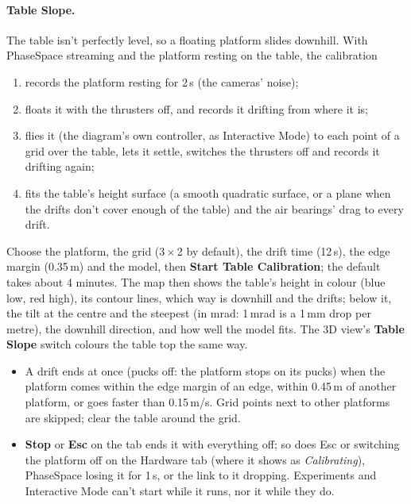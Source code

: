 \documentclass[11pt,a4paper]{article}
\newcommand{\ui}[1]{\textsf{\textbf{#1}}}
\begin{document}
\paragraph{Table Slope.} The table isn't perfectly level, so a floating platform slides downhill. With PhaseSpace
streaming and the platform resting on the table, the calibration
\begin{enumerate}[nosep]
  \item records the platform resting for 2\,s (the cameras' noise);
  \item floats it with the thrusters off, and records it drifting from where it is;
  \item flies it (the diagram's own controller, as Interactive Mode) to each point of a grid over the table, lets it
        settle, switches the thrusters off and records it drifting again;
  \item fits the table's height surface (a smooth quadratic surface, or a plane when the drifts don't cover enough
        of the table) and the air bearings' drag to every drift.
\end{enumerate}
Choose the platform, the grid (3\,$\times$\,2 by default), the drift time (12\,s), the edge margin (0.35\,m) and the
model, then \ui{Start Table Calibration}; the default takes about 4 minutes. The map then shows the table's height
in colour (blue low, red high), its contour lines, which way is downhill and the drifts; below it, the tilt at the
centre and the steepest (in mrad: 1\,mrad is a 1\,mm drop per metre), the downhill direction, and how well the
model fits. The 3D view's \ui{Table Slope} switch colours the table top the same way.

\begin{warnbox}
\begin{itemize}[nosep]
  \item A drift ends at once (pucks off: the platform stops on its pucks) when the platform comes within the edge
        margin of an edge, within 0.45\,m of another platform, or goes faster than 0.15\,m/s. Grid points next to
        other platforms are skipped; clear the table around the grid.
  \item \ui{Stop} or \textbf{Esc} on the tab ends it with everything off; so does Esc or switching the platform off
        on the Hardware tab (where it shows as \emph{Calibrating}), PhaseSpace losing it for 1\,s, or the link to it
        dropping. Experiments and Interactive Mode can't start while it runs, nor it while they do.
\end{itemize}
\end{warnbox}
\end{document}
